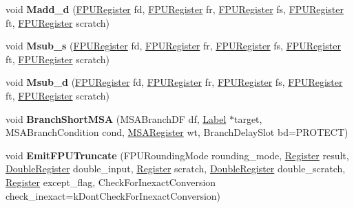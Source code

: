 \begin{DoxyCompactItemize}
void {\bfseries Madd\+\_\+d} (\mbox{\hyperlink{classv8_1_1internal_1_1FPURegister}{F\+P\+U\+Register}} fd, \mbox{\hyperlink{classv8_1_1internal_1_1FPURegister}{F\+P\+U\+Register}} fr, \mbox{\hyperlink{classv8_1_1internal_1_1FPURegister}{F\+P\+U\+Register}} fs, \mbox{\hyperlink{classv8_1_1internal_1_1FPURegister}{F\+P\+U\+Register}} ft, \mbox{\hyperlink{classv8_1_1internal_1_1FPURegister}{F\+P\+U\+Register}} scratch)
\item 
\mbox{\label{classv8_1_1internal_1_1MacroAssembler_a43b51a1a5cca3e572f49c81cf6eb4d20}} 
void {\bfseries Msub\+\_\+s} (\mbox{\hyperlink{classv8_1_1internal_1_1FPURegister}{F\+P\+U\+Register}} fd, \mbox{\hyperlink{classv8_1_1internal_1_1FPURegister}{F\+P\+U\+Register}} fr, \mbox{\hyperlink{classv8_1_1internal_1_1FPURegister}{F\+P\+U\+Register}} fs, \mbox{\hyperlink{classv8_1_1internal_1_1FPURegister}{F\+P\+U\+Register}} ft, \mbox{\hyperlink{classv8_1_1internal_1_1FPURegister}{F\+P\+U\+Register}} scratch)
\item 
\mbox{\label{classv8_1_1internal_1_1MacroAssembler_a57e370bfd854b19a86e176ca5e561c4e}} 
void {\bfseries Msub\+\_\+d} (\mbox{\hyperlink{classv8_1_1internal_1_1FPURegister}{F\+P\+U\+Register}} fd, \mbox{\hyperlink{classv8_1_1internal_1_1FPURegister}{F\+P\+U\+Register}} fr, \mbox{\hyperlink{classv8_1_1internal_1_1FPURegister}{F\+P\+U\+Register}} fs, \mbox{\hyperlink{classv8_1_1internal_1_1FPURegister}{F\+P\+U\+Register}} ft, \mbox{\hyperlink{classv8_1_1internal_1_1FPURegister}{F\+P\+U\+Register}} scratch)
\item 
\mbox{\label{classv8_1_1internal_1_1MacroAssembler_a8e89e4c48731303d2fbe5c27d69a9ac3}} 
void {\bfseries Branch\+Short\+M\+SA} (M\+S\+A\+Branch\+DF df, \mbox{\hyperlink{classv8_1_1internal_1_1Label}{Label}} $\ast$target, M\+S\+A\+Branch\+Condition cond, \mbox{\hyperlink{classv8_1_1internal_1_1MSARegister}{M\+S\+A\+Register}} wt, Branch\+Delay\+Slot bd=P\+R\+O\+T\+E\+CT)
\item 
\mbox{\label{classv8_1_1internal_1_1MacroAssembler_af98670774ef916ce9675fbda524feafa}} 
void {\bfseries Emit\+F\+P\+U\+Truncate} (F\+P\+U\+Rounding\+Mode rounding\+\_\+mode, \mbox{\hyperlink{classv8_1_1internal_1_1Register}{Register}} result, \mbox{\hyperlink{classv8_1_1internal_1_1DoubleRegister}{Double\+Register}} double\+\_\+input, \mbox{\hyperlink{classv8_1_1internal_1_1Register}{Register}} scratch, \mbox{\hyperlink{classv8_1_1internal_1_1DoubleRegister}{Double\+Register}} double\+\_\+scratch, \mbox{\hyperlink{classv8_1_1internal_1_1Register}{Register}} except\+\_\+flag, Check\+For\+Inexact\+Conversion check\+\_\+inexact=k\+Dont\+Check\+For\+Inexact\+Conversion)

\end{DoxyCompactItemize}
